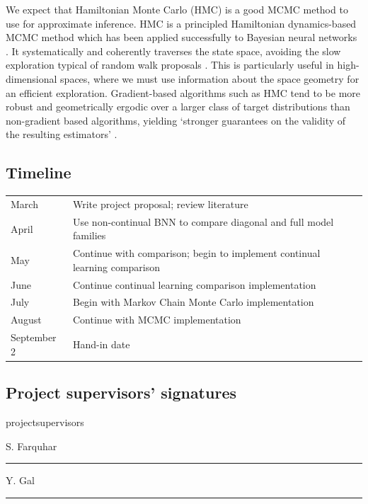 \documentclass[a4paper,11pt]{article}
\begin{document}
\begin{enumerate}
We expect that Hamiltonian Monte Carlo (HMC) is a good MCMC method to use for approximate inference. HMC is a principled Hamiltonian dynamics-based MCMC method which has been applied successfully to Bayesian neural networks \cite{bayesianlearning}. It systematically and coherently traverses the state space, avoiding the slow exploration typical of random walk proposals \cite{hmc}. This is particularly useful in high-dimensional spaces, where we must use information about the space geometry for an efficient exploration. Gradient-based algorithms such as HMC tend to be more robust and geometrically ergodic over a larger class of target distributions than non-gradient based algorithms, yielding `stronger guarantees on the validity of the resulting estimators' \cite{conceptual}.
\end{enumerate}


\subsection*{Timeline}

\begin{tabular}{l|l}
\hline
March 	& Write project proposal; review literature\\
April	& Use non-continual BNN to compare diagonal and full model families\\
May		& Continue with comparison; begin to implement continual learning comparison\\
June 	& Continue continual learning comparison implementation\\
July	& Begin with Markov Chain Monte Carlo implementation\\
August	& Continue with MCMC implementation\\
September 2 & Hand-in date\\
\hline
\end{tabular}

\subsection*{Project supervisors' signatures}

\begin{labeling}{projectsupervisors}
\vspace*{2.25em}
\item[S. Farquhar] \rule{5cm}{1pt}
\vspace*{2.5em}
\item[Y. Gal] \rule{5cm}{1pt}
\end{labeling}
\end{document}
